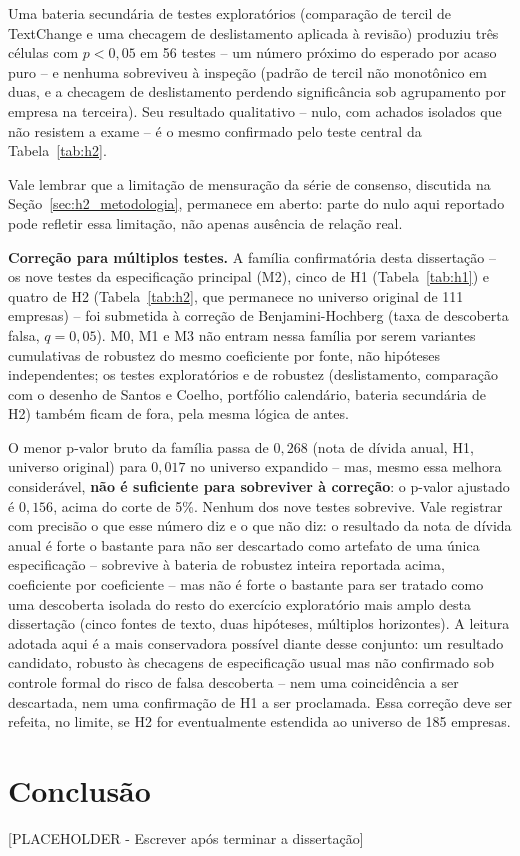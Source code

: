 \documentclass[a4paper,12pt]{report}
\begin{document}
Uma bateria secundária de testes exploratórios (comparação de tercil de TextChange e uma checagem de deslistamento aplicada à revisão) produziu três células com $p<0{,}05$ em 56 testes -- um número próximo do esperado por acaso puro -- e nenhuma sobreviveu à inspeção (padrão de tercil não monotônico em duas, e a checagem de deslistamento perdendo significância sob agrupamento por empresa na terceira). Seu resultado qualitativo -- nulo, com achados isolados que não resistem a exame -- é o mesmo confirmado pelo teste central da Tabela~\ref{tab:h2}.

Vale lembrar que a limitação de mensuração da série de consenso, discutida na Seção~\ref{sec:h2_metodologia}, permanece em aberto: parte do nulo aqui reportado pode refletir essa limitação, não apenas ausência de relação real.

\textbf{Correção para múltiplos testes.} A família confirmatória desta dissertação -- os nove testes da especificação principal (M2), cinco de H1 (Tabela~\ref{tab:h1}) e quatro de H2 (Tabela~\ref{tab:h2}, que permanece no universo original de 111 empresas) -- foi submetida à correção de Benjamini-Hochberg \cite{benjaminihochberg1995} (taxa de descoberta falsa, $q=0{,}05$). M0, M1 e M3 não entram nessa família por serem variantes cumulativas de robustez do mesmo coeficiente por fonte, não hipóteses independentes; os testes exploratórios e de robustez (deslistamento, comparação com o desenho de Santos e Coelho, portfólio calendário, bateria secundária de H2) também ficam de fora, pela mesma lógica de antes.

O menor p-valor bruto da família passa de $0{,}268$ (nota de dívida anual, H1, universo original) para $0{,}017$ no universo expandido -- mas, mesmo essa melhora considerável, \textbf{não é suficiente para sobreviver à correção}: o p-valor ajustado é $0{,}156$, acima do corte de 5\%. Nenhum dos nove testes sobrevive. Vale registrar com precisão o que esse número diz e o que não diz: o resultado da nota de dívida anual é forte o bastante para não ser descartado como artefato de uma única especificação -- sobrevive à bateria de robustez inteira reportada acima, coeficiente por coeficiente -- mas não é forte o bastante para ser tratado como uma descoberta isolada do resto do exercício exploratório mais amplo desta dissertação (cinco fontes de texto, duas hipóteses, múltiplos horizontes). A leitura adotada aqui é a mais conservadora possível diante desse conjunto: um resultado candidato, robusto às checagens de especificação usual mas não confirmado sob controle formal do risco de falsa descoberta -- nem uma coincidência a ser descartada, nem uma confirmação de H1 a ser proclamada. Essa correção deve ser refeita, no limite, se H2 for eventualmente estendida ao universo de 185 empresas.

\chapter{Conclusão}
\label{ch:conclusao}

[PLACEHOLDER - Escrever após terminar a dissertação]



\end{document}
